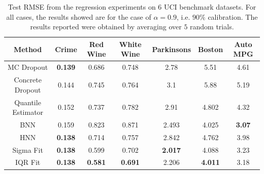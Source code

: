 \documentclass[letterpaper]{article} %
\begin{document}
\begin{table}[t]
	\centering
	\caption{Test RMSE from the regression experiments on $6$ UCI benchmark datasets. For all cases, the results showed are for the case of $\alpha = 0.9$, i.e. $90\%$ calibration. The results reported were obtained by averaging over $5$ random trials.}

	\begin{tabular}{|c|c|c|c|c|c|c|}
		\hline
		\rule{0pt}{2ex}
		\textbf{Method} & \cellcolor{gray!5}\textbf{Crime} & \cellcolor{gray!10}\textbf{Red Wine} & \cellcolor{gray!15}\textbf{White Wine} & \cellcolor{gray!20}\textbf{Parkinsons} & \cellcolor{gray!25}\textbf{Boston} & \cellcolor{gray!30}\textbf{Auto MPG} \\ \hline \hline
        \rule{0pt}{2ex}
		MC Dropout & \cellcolor{gray!5}\textbf{0.139} & \cellcolor{gray!10}0.686 & \cellcolor{gray!15}0.748 &  \cellcolor{gray!20}2.78 & \cellcolor{gray!25}5.51 & \cellcolor{gray!30}4.61 \\
        \rule{0pt}{2ex}
		Concrete Dropout & \cellcolor{gray!5}0.144 & \cellcolor{gray!10}0.745 & \cellcolor{gray!15}0.764 &  \cellcolor{gray!20}3.1 &\cellcolor{gray!25} 5.88 & \cellcolor{gray!30}5.19 \\
        \rule{0pt}{2ex}
		Quantile Estimator & \cellcolor{gray!5}0.152 & \cellcolor{gray!10}0.737 & \cellcolor{gray!15}0.782 &  \cellcolor{gray!20}2.91 &\cellcolor{gray!25} 4.802 & \cellcolor{gray!30}4.32\\
        \rule{0pt}{2ex}
		BNN & \cellcolor{gray!5}0.159 & \cellcolor{gray!10}0.823 & \cellcolor{gray!15}0.871 &  \cellcolor{gray!20}2.493 & \cellcolor{gray!25}4.025 & \cellcolor{gray!30}\textbf{3.07} \\
        \rule{0pt}{2ex}
		HNN & \cellcolor{gray!5}\textbf{0.138} & \cellcolor{gray!10}0.714 & \cellcolor{gray!15}0.757 &  \cellcolor{gray!20}2.842 & \cellcolor{gray!25}4.762 & \cellcolor{gray!30}3.98 \rule{0pt}{2ex}  \\
		\hline
		\hline
		Sigma Fit & \cellcolor{gray!5}\textbf{0.138} & \cellcolor{gray!10}0.599 & \cellcolor{gray!15}0.702 &  \cellcolor{gray!20}\textbf{2.017} & \cellcolor{gray!25}4.088 & \cellcolor{gray!30}3.23 \\
        \rule{0pt}{2ex}
		IQR Fit & \cellcolor{gray!5}\textbf{0.138} & \cellcolor{gray!10}\textbf{0.581} & \cellcolor{gray!15}\textbf{0.691} &  \cellcolor{gray!20}2.206 &\cellcolor{gray!25} \textbf{4.011} & \cellcolor{gray!30}3.18\\

		\hline
	\end{tabular}
	\label{table:regression exp}
\end{table}
\end{document}
